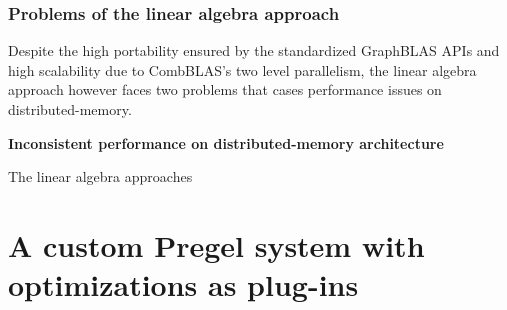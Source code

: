 \documentclass{sokendai_thesis} %
\begin{document}
\subsection{Problems of the linear algebra approach}

Despite the high portability ensured by the standardized GraphBLAS APIs and high scalability due to CombBLAS's two level parallelism, the linear algebra approach however faces two problems that cases performance issues on distributed-memory.

\textbf{Inconsistent performance on distributed-memory architecture}

The linear algebra approaches 

\chapter{A custom Pregel system with optimizations as plug-ins}
\label{chap:vcgp}
\end{document}
